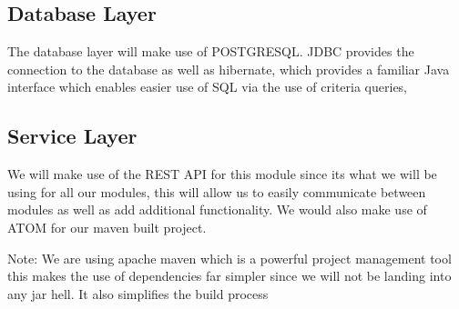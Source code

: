 \documentclass{article}
\begin{document}
		\subsection{Database Layer}
		The database layer will make use of POSTGRESQL. JDBC provides the connection to the database as well as hibernate, which provides a familiar Java interface which enables easier use of SQL via the use of criteria queries, 
	
		
		\subsection{Service Layer}
		We will make use of the REST API for this module since its what we will be using for all our modules, this will allow us to easily communicate between modules as well as add additional functionality. We would also make use of ATOM for our maven built project. 

		Note: We are using apache maven which is a powerful project management tool this makes the use of dependencies far simpler since we will not be landing into any jar hell. It also simplifies the build process
 	
	 \newpage
 	
\end{document}
